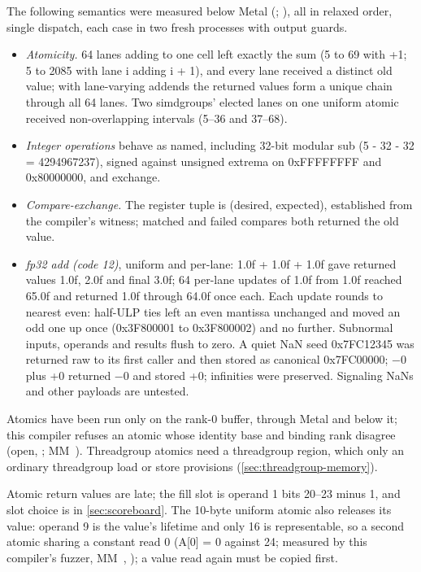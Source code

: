The following semantics were measured below Metal (; ),
all in relaxed order, single dispatch, each case in two fresh processes with output guards.

\begin{itemize}
\item \emph{Atomicity.} 64 lanes adding to one cell left exactly the sum (5 to 69 with +1; 5 to 2085 with lane i adding i + 1), and
  every lane received a distinct old value; with lane-varying addends the returned values form a unique chain through all
  64 lanes. Two simdgroups' elected lanes on one uniform atomic received non-overlapping intervals (5–36 and 37–68).
\item \emph{Integer operations} behave as named, including 32-bit modular sub (5 - 32 - 32 = 4294967237), signed against unsigned
  extrema on 0xFFFFFFFF and 0x80000000, and exchange.
\item \emph{Compare-exchange.} The register tuple is (desired, expected), established from the compiler's witness; matched and
  failed compares both returned the old value.
\item \emph{fp32 add (code 12)}, uniform and per-lane: 1.0f + 1.0f + 1.0f gave returned values 1.0f, 2.0f and final 3.0f; 64
  per-lane updates of 1.0f from 1.0f reached 65.0f and returned 1.0f through 64.0f once each. Each update rounds to
  nearest even: half-ULP ties left an even mantissa unchanged and moved an odd one up once (0x3F800001 to 0x3F800002) and
  no further. Subnormal inputs, operands and results flush to zero. A quiet NaN seed 0x7FC12345 was returned raw to its
  first caller and then stored as canonical 0x7FC00000; −0 plus +0 returned −0 and stored +0; infinities were preserved.
  Signaling NaNs and other payloads are untested.
\end{itemize}

Atomics have been run only on the rank-0 buffer, through Metal and below it; this compiler refuses an
atomic whose identity base and binding rank disagree (open, ; MM~). Threadgroup atomics need a
threadgroup region, which only an ordinary threadgroup load or store provisions (\cref{sec:threadgroup-memory}).

Atomic return values are late; the fill slot is operand 1 bits 20–23 minus 1, and slot choice is in \cref{sec:scoreboard}. The 10-byte uniform atomic also releases its value: operand 9 is the value's lifetime and only 16 is
representable, so a second atomic sharing a constant read 0 (A{[}0{]} = 0 against 24; measured by this compiler's fuzzer,
MM~, ); a value read again must be copied first.

